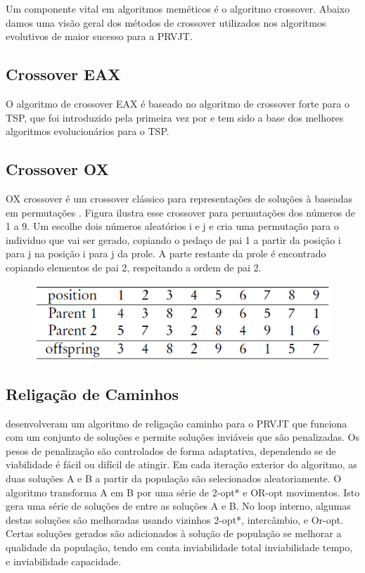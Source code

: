  
Um componente vital em algoritmos meméticos é o algoritmo crossover. Abaixo damos uma visão geral dos métodos de crossover utilizados nos algoritmos evolutivos de maior sucesso para a PRVJT.
 


\subsection{Crossover EAX}

 O algoritmo de crossover EAX é baseado no algoritmo de crossover forte para o TSP, que foi introduzido pela primeira vez por \cite{nagata06} e tem sido a base dos melhores algoritmos evolucionários para o TSP.
 
 
\subsection{Crossover OX}

OX crossover é um  crossover clássico para representações de soluções à baseadas em permutações \cite{falkenauer91}. Figura ilustra esse crossover para permutações dos números de 1 a 9. Um escolhe dois números aleatórios i e j e cria uma permutação para o individuo que vai ser gerado, copiando o pedaço de pai 1 a partir da posição i para j na posição i para j da prole. A parte restante da prole é encontrado copiando elementos de pai 2, respeitando a ordem de pai 2.
 
 
 
\begin{figure}[ht!]
\centering
\includegraphics[scale=0.8]{figuras/ox-crossover.PNG}
\label{ox-crossover}
\end{figure}
 
\subsection{Religação de Caminhos}



\cite{hashimoto08} desenvolveram um algoritmo de religação caminho para o PRVJT que funciona com um conjunto de soluções e permite soluções inviáveis que são penalizadas. Os pesos de penalização são controlados de forma adaptativa, dependendo se de viabilidade é fácil ou difícil de atingir. Em cada iteração exterior do algoritmo, as duas soluções A e B a partir da população são selecionados aleatoriamente. O algoritmo transforma A em B por uma série de 2-opt* e OR-opt movimentos. Isto gera uma série de soluções de entre as soluções A e B. No loop interno, algumas destas soluções são melhoradas usando vizinhos 2-opt*, intercâmbio, e Or-opt. Certas soluções gerados são adicionados à solução de população se melhorar a qualidade da população, tendo em conta inviabilidade total inviabilidade tempo, e inviabilidade capacidade.
 

